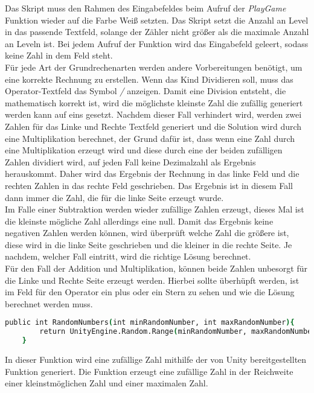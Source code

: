 Das Skript muss den Rahmen des Eingabefeldes beim Aufruf der \textit{PlayGame} Funktion wieder auf die Farbe Weiß setzten. Das Skript setzt die Anzahl an Level in das passende Textfeld, solange der Zähler nicht größer als die maximale Anzahl an Leveln ist. Bei jedem Aufruf der Funktion wird das Eingabefeld geleert, sodass keine Zahl in dem Feld steht.\\
Für jede Art der Grundrechenarten werden andere Vorbereitungen benötigt, um eine korrekte Rechnung zu erstellen. Wenn das Kind Dividieren soll, muss das Operator-Textfeld das Symbol \textit{/} anzeigen. Damit eine Division entsteht, die mathematisch korrekt ist, wird die möglichste kleinste Zahl die zufällig generiert werden kann auf eins gesetzt. Nachdem dieser Fall verhindert wird, werden zwei Zahlen für das Linke und Rechte Textfeld generiert und die Solution wird durch eine Multiplikation berechnet, der Grund dafür ist, dass wenn eine Zahl durch eine Multiplikation erzeugt wird und diese durch eine der beiden zufälligen Zahlen dividiert wird, auf jeden Fall keine Dezimalzahl als Ergebnis herauskommt. Daher wird das Ergebnis der Rechnung in das linke Feld und die rechten Zahlen in das rechte Feld geschrieben. Das Ergebnis ist in diesem Fall dann immer die Zahl, die für die linke Seite erzeugt wurde.\\
Im Falle einer Subtraktion werden wieder zufällige Zahlen erzeugt, dieses Mal ist die kleinste mögliche Zahl allerdings eine null. Damit das Ergebnis keine negativen Zahlen werden können, wird überprüft welche Zahl die größere ist, diese wird in die linke Seite geschrieben und die kleiner in die rechte Seite. Je nachdem, welcher Fall eintritt, wird die richtige Lösung berechnet.\\
Für den Fall der Addition und Multiplikation, können beide Zahlen unbesorgt für die Linke und Rechte Seite erzeugt werden. Hierbei sollte überhüpft werden, ist im Feld für den Operator ein plus oder ein Stern zu sehen  und wie die Lösung berechnet werden muss.\\
\begin{lstlisting}[language=csh, caption={MathOperations.cs RandomNumber Funktion}]
	public int RandomNumbers(int minRandomNumber, int maxRandomNumber){
		return UnityEngine.Random.Range(minRandomNumber, maxRandomNumber);
	}
\end{lstlisting}
In dieser Funktion wird eine zufällige Zahl mithilfe der von Unity bereitgestellten Funktion generiert. Die Funktion erzeugt eine zufällige Zahl in der Reichweite einer kleinstmöglichen Zahl und einer maximalen Zahl.\\
